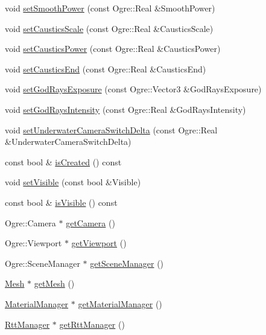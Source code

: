 \begin{CompactItemize}
void \hyperlink{class_hydrax_1_1_hydrax_a8f4c456888deffc3cbe523c0666a66b}{setSmoothPower} (const Ogre::Real \&SmoothPower)
\item 
void \hyperlink{class_hydrax_1_1_hydrax_a0d4bb8262e28ef9e6ff273503266889}{setCausticsScale} (const Ogre::Real \&CausticsScale)
\item 
void \hyperlink{class_hydrax_1_1_hydrax_78ed497eda748ca0699f170cbc491e13}{setCausticsPower} (const Ogre::Real \&CausticsPower)
\item 
void \hyperlink{class_hydrax_1_1_hydrax_f194156ce3a8647bcb447a2ce8d8c932}{setCausticsEnd} (const Ogre::Real \&CausticsEnd)
\item 
void \hyperlink{class_hydrax_1_1_hydrax_496d60d593ecf694a5a701d5a42f27b1}{setGodRaysExposure} (const Ogre::Vector3 \&GodRaysExposure)
\item 
void \hyperlink{class_hydrax_1_1_hydrax_fbc9ef3ee75b67003c04e67db2ef223e}{setGodRaysIntensity} (const Ogre::Real \&GodRaysIntensity)
\item 
void \hyperlink{class_hydrax_1_1_hydrax_2ea24fcd2e01968d8dc86c36168a5819}{setUnderwaterCameraSwitchDelta} (const Ogre::Real \&UnderwaterCameraSwitchDelta)
\item 
const bool \& \hyperlink{class_hydrax_1_1_hydrax_58b37d035d0391ce7873a21240c83207}{isCreated} () const 
\item 
void \hyperlink{class_hydrax_1_1_hydrax_2c6e89c89098c1ae2f152b0cac0ecfde}{setVisible} (const bool \&Visible)
\item 
const bool \& \hyperlink{class_hydrax_1_1_hydrax_b573f6c6e548a4c501b80a465659ab61}{isVisible} () const 
\item 
Ogre::Camera $\ast$ \hyperlink{class_hydrax_1_1_hydrax_ef185c906434b6dfb7c67a425d678287}{getCamera} ()
\item 
Ogre::Viewport $\ast$ \hyperlink{class_hydrax_1_1_hydrax_969555d8f856a43c4ca6c92bb0958bf1}{getViewport} ()
\item 
Ogre::SceneManager $\ast$ \hyperlink{class_hydrax_1_1_hydrax_4f6dfef270938f04d0430eaf8e1fa88f}{getSceneManager} ()
\item 
\hyperlink{class_hydrax_1_1_mesh}{Mesh} $\ast$ \hyperlink{class_hydrax_1_1_hydrax_1940a144c486915885ed19026839d381}{getMesh} ()
\item 
\hyperlink{class_hydrax_1_1_material_manager}{MaterialManager} $\ast$ \hyperlink{class_hydrax_1_1_hydrax_572279649449549c7be3ef809221fbae}{getMaterialManager} ()
\item 
\hyperlink{class_hydrax_1_1_rtt_manager}{RttManager} $\ast$ \hyperlink{class_hydrax_1_1_hydrax_86b446e4a8fdb64e71b3f3f71ea2f68a}{getRttManager} ()

\end{CompactItemize}
